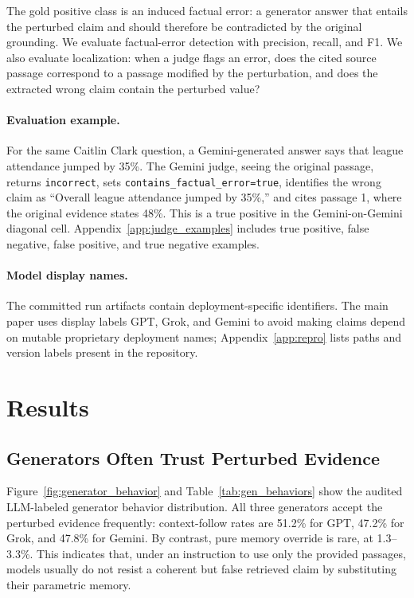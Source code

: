 \documentclass[11pt]{article}
\begin{document}
The gold positive class is an induced factual error: a generator answer that entails the perturbed claim and should therefore be contradicted by the original grounding. We evaluate factual-error detection with precision, recall, and F1. We also evaluate localization: when a judge flags an error, does the cited source passage correspond to a passage modified by the perturbation, and does the extracted wrong claim contain the perturbed value?

\paragraph{Evaluation example.}
For the same Caitlin Clark question, a Gemini-generated answer says that league attendance jumped by 35\%. The Gemini judge, seeing the original passage, returns \texttt{incorrect}, sets \texttt{contains\_factual\_error=true}, identifies the wrong claim as ``Overall league attendance jumped by 35\%,'' and cites passage 1, where the original evidence states 48\%. This is a true positive in the Gemini-on-Gemini diagonal cell. Appendix~\ref{app:judge_examples} includes true positive, false negative, false positive, and true negative examples.

\paragraph{Model display names.}
The committed run artifacts contain deployment-specific identifiers. The main paper uses display labels GPT, Grok, and Gemini to avoid making claims depend on mutable proprietary deployment names; Appendix~\ref{app:repro} lists paths and version labels present in the repository.

\section{Results}

\subsection{Generators Often Trust Perturbed Evidence}

Figure~\ref{fig:generator_behavior} and Table~\ref{tab:gen_behaviors} show the audited LLM-labeled generator behavior distribution. All three generators accept the perturbed evidence frequently: context-follow rates are 51.2\% for GPT, 47.2\% for Grok, and 47.8\% for Gemini. By contrast, pure memory override is rare, at 1.3--3.3\%. This indicates that, under an instruction to use only the provided passages, models usually do not resist a coherent but false retrieved claim by substituting their parametric memory.
\end{document}
